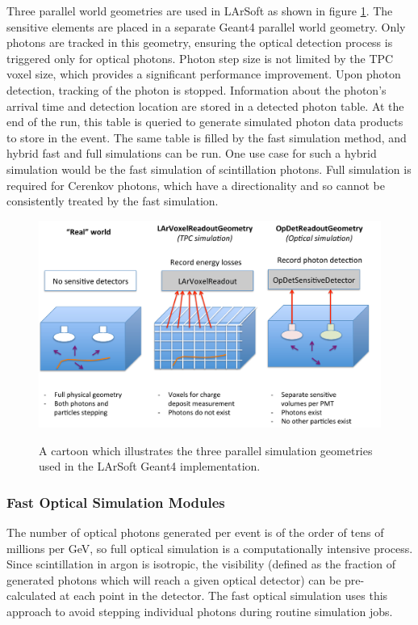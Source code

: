 \documentclass[12pt]{elsarticle}
\newcommand{\larsoft}{LArSoft }
\begin{document}
Three parallel world geometries are used in \larsoft as shown in figure \ref{fig:parallelgeom}.
The sensitive elements are placed in a separate Geant4 parallel world geometry.  Only photons are tracked in this geometry, ensuring the optical  detection process is triggered only for optical photons.  Photon step size is not limited by the TPC voxel size, which provides a significant performance improvement. Upon photon detection, tracking of the photon is stopped. Information about the photon's arrival time and detection location are stored in a detected photon table.  At the end of the run, this table is queried to generate simulated photon data products to store in the event.  The same table is filled by the fast simulation method, and hybrid fast and full simulations can be run.  One use case for such a hybrid simulation would be the fast simulation of scintillation photons. Full simulation is required for Cerenkov photons, which have a directionality and so cannot be consistently treated by the fast simulation.


\begin{figure}[h]
\centering
\caption{A cartoon which illustrates the three parallel simulation geometries used in the \larsoft
Geant4 implementation.}
\includegraphics[width=6.0in]{./mtrls/imgs/ParallelGeomScheme.pdf}
\label{fig:parallelgeom}
\end{figure}

\subsubsection{Fast Optical Simulation Modules}

The number of optical photons generated per event is of the order of tens of millions per GeV, so full optical simulation is a computationally intensive process.  Since scintillation in argon is isotropic, the visibility (defined as the fraction of generated photons which will reach a given optical detector) can be pre-calculated at each point in the detector.  The fast optical simulation uses this approach to avoid stepping individual photons during routine simulation jobs.
\end{document}
